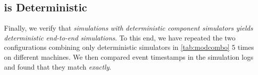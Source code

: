 \subsection{\sysname is Deterministic}
\label{ssec:eval:deterministic}
Finally, we verify that \emph{\sysname simulations with deterministic component
simulators yields deterministic end-to-end simulations}.
%
To this end, we have repeated the two configurations combining only
deterministic simulators in \autoref{tab:modcombo} 5 times on
different machines.
%
We then compared event timestamps in the simulation logs and found
that they match \textit{exactly}.
